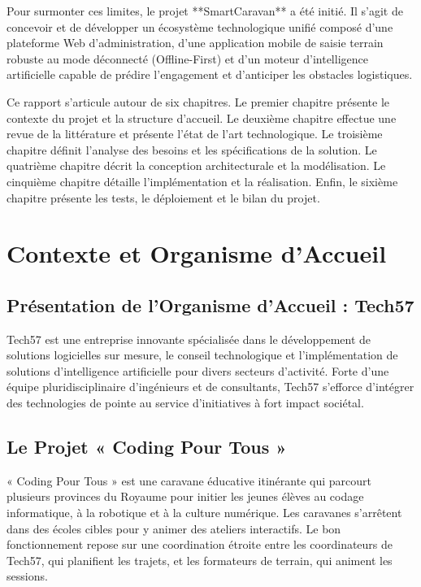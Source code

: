 \documentclass[12pt,a4paper]{report}
\begin{document}
Pour surmonter ces limites, le projet **SmartCaravan** a été initié. Il s'agit de concevoir et de développer un écosystème technologique unifié composé d'une plateforme Web d'administration, d'une application mobile de saisie terrain robuste au mode déconnecté (Offline-First) et d'un moteur d'intelligence artificielle capable de prédire l'engagement et d'anticiper les obstacles logistiques.

Ce rapport s'articule autour de six chapitres. Le premier chapitre présente le contexte du projet et la structure d'accueil. Le deuxième chapitre effectue une revue de la littérature et présente l'état de l'art technologique. Le troisième chapitre définit l'analyse des besoins et les spécifications de la solution. Le quatrième chapitre décrit la conception architecturale et la modélisation. Le cinquième chapitre détaille l'implémentation et la réalisation. Enfin, le sixième chapitre présente les tests, le déploiement et le bilan du projet.

\chapter{Contexte et Organisme d'Accueil}

\section{Présentation de l'Organisme d'Accueil : Tech57}
Tech57 est une entreprise innovante spécialisée dans le développement de solutions logicielles sur mesure, le conseil technologique et l'implémentation de solutions d'intelligence artificielle pour divers secteurs d'activité. Forte d'une équipe pluridisciplinaire d'ingénieurs et de consultants, Tech57 s'efforce d'intégrer des technologies de pointe au service d'initiatives à fort impact sociétal.

\section{Le Projet « Coding Pour Tous »}
« Coding Pour Tous » est une caravane éducative itinérante qui parcourt plusieurs provinces du Royaume pour initier les jeunes élèves au codage informatique, à la robotique et à la culture numérique. 
Les caravanes s'arrêtent dans des écoles cibles pour y animer des ateliers interactifs. Le bon fonctionnement repose sur une coordination étroite entre les coordinateurs de Tech57, qui planifient les trajets, et les formateurs de terrain, qui animent les sessions.
\end{document}
